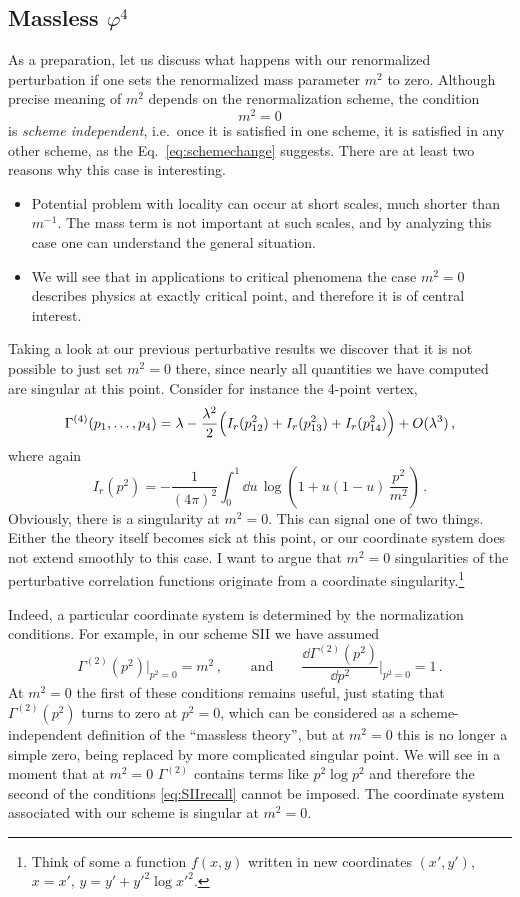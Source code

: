 \subsection*{Massless \texorpdfstring{$\varphi^4$}{phi**4}}

As a preparation, let us discuss what happens with our renormalized perturbation
if one sets the renormalized mass parameter $m^2$ to zero. Although precise
meaning of $m^2$ depends on the renormalization scheme, the condition
\[
m^2=0
\]
is \emph{scheme independent}, i.e.\ once it is satisfied in one scheme, it is
satisfied in any other scheme, as the Eq.~\eqref{eq:schemechange} suggests.
There are at least two reasons why this case is interesting.
\begin{itemize}
\item Potential problem with locality can occur at short scales, much shorter
than $m^{-1}$. The mass term is not important at such scales, and by analyzing
this case one can understand the general situation.
\item We will see that in applications to critical phenomena the case $m^2=0$
describes physics at exactly critical point, and therefore it is of central
interest.
\end{itemize}

Taking a look at our previous perturbative results we discover that it is not
possible to just set $m^2=0$ there, since nearly all quantities we have computed
are singular at this point. Consider for instance the 4-point vertex,
\[
\Gamma^{(4)}(p_1,\dots,p_4)=\lambda-\frac{\lambda^2}2\Bigl(I_r(p_{12}^2)+I_r(p_{13}^2)+I_r(p_{14}^2)\Bigr)+O(\lambda^3)\,,
\]
where again
\[
I_r(p^2)=-\frac1{(4\pi)^2}\int_0^1\dd u\,\log\left(1+u(1-u)\,\frac{p^2}{m^2}\right)\,.
\]
Obviously, there is a singularity at $m^2=0$. This can signal one of two things.
Either the theory itself becomes sick at this point, or our coordinate system
does not extend smoothly to this case. I want to argue that $m^2=0$
singularities of the perturbative correlation functions originate from a
coordinate singularity.\footnote{Think of some a function $f(x,y)$ written in new
coordinates $(x',y')$, $x=x'$, $y=y'+y'^2\log x'^2$.}

Indeed, a particular coordinate system is determined by the normalization
conditions. For example, in our scheme SII we have assumed
\begin{equation}\label{eq:SIIrecall}
\Gamma^{(2)}(p^2)\Big|_{p^2=0}=m^2\,,\qquad\text{and}\qquad\frac{\dd\Gamma^{(2)}(p^2)}{\dd p^2}\Big|_{p^2=0}=1\,.
\end{equation}
At $m^2=0$ the first of these conditions remains useful, just stating that
$\Gamma^{(2)}(p^2)$ turns to zero at $p^2=0$, which can be considered as a
scheme-independent definition of the ``massless theory'', but at $m^2=0$ this is
no longer a simple zero, being replaced by more complicated singular point. We
will see in a moment that at $m^2=0$ $\Gamma^{(2)}$ contains terms like
$p^2\log p^2$ and therefore the second of the conditions \eqref{eq:SIIrecall}
cannot be imposed. The coordinate system associated with our scheme is singular
at $m^2=0$.

